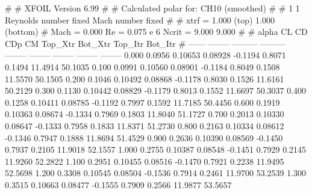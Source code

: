 #  
#       XFOIL         Version 6.99
#  
# Calculated polar for: CH10 (smoothed)                                 
#  
# 1 1 Reynolds number fixed          Mach number fixed         
#  
# xtrf =   1.000 (top)        1.000 (bottom)  
# Mach =   0.000     Re =     0.075 e 6     Ncrit =   9.000  9.000
#  
#   alpha    CL        CD       CDp       CM     Top_Xtr  Bot_Xtr  Top_Itr  Bot_Itr
#  ------ -------- --------- --------- -------- -------- -------- -------- --------
   0.000   0.0956   0.10653   0.08928  -0.1194   0.8071   0.1494  11.4914  50.1035
   0.100   0.0991   0.10560   0.08901  -0.1184   0.8049   0.1508  11.5570  50.1505
   0.200   0.1046   0.10492   0.08868  -0.1178   0.8030   0.1526  11.6161  50.2129
   0.300   0.1130   0.10442   0.08829  -0.1179   0.8013   0.1552  11.6697  50.3037
   0.400   0.1258   0.10411   0.08785  -0.1192   0.7997   0.1592  11.7185  50.4456
   0.600   0.1919   0.10363   0.08674  -0.1334   0.7969   0.1803  11.8040  51.1727
   0.700   0.2013   0.10330   0.08647  -0.1333   0.7958   0.1833  11.8371  51.2730
   0.800   0.2163   0.10334   0.08612  -0.1346   0.7947   0.1888  11.8694  51.4529
   0.900   0.2636   0.10390   0.08569  -0.1450   0.7937   0.2105  11.9018  52.1557
   1.000   0.2755   0.10387   0.08548  -0.1451   0.7929   0.2145  11.9260  52.2822
   1.100   0.2951   0.10455   0.08516  -0.1470   0.7921   0.2238  11.9495  52.5698
   1.200   0.3308   0.10545   0.08504  -0.1536   0.7914   0.2461  11.9700  53.2539
   1.300   0.3515   0.10663   0.08477  -0.1555   0.7909   0.2566  11.9877  53.5657
